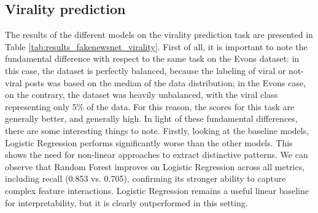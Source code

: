 \documentclass[a4paper,twoside,12pt]{book}
\begin{document}
\subsection{Virality prediction}
\begin{table}[h!]
	\centering
	\caption{Model Performance Comparison on virality prediction (Cross-Validation Averages) -- FakeNewsNet}
	\label{tab:results_fakenewsnet_virality}
	\vspace{0.5em}
\end{table}

The results of the different models on the virality prediction task are presented in Table \ref{tab:results_fakenewsnet_virality}. First of all, it is important to note the fundamental difference with respect to the same task on the Evons dataset: in this case, the dataset is perfectly balanced, because the labeling of viral or not-viral posts was based on the median of the data distribution; in the Evons case, on the contrary, the dataset was heavily unbalanced, with the viral class representing only 5\% of the data. For this reason, the scores for this task are generally better, and generally high. In light of these fundamental differences, there are some interesting things to note. Firstly, looking at the baseline models, Logistic Regression performs significantly worse than the other models. This shows the need for non-linear approaches to extract distinctive patterns. We can observe that Random Forest improves on Logistic Regression across all metrics, including recall (0.853 vs. 0.705), confirming its stronger ability to capture complex feature interactions. Logistic Regression remains a useful linear baseline for interpretability, but it is clearly outperformed in this setting.\\
\end{document}

